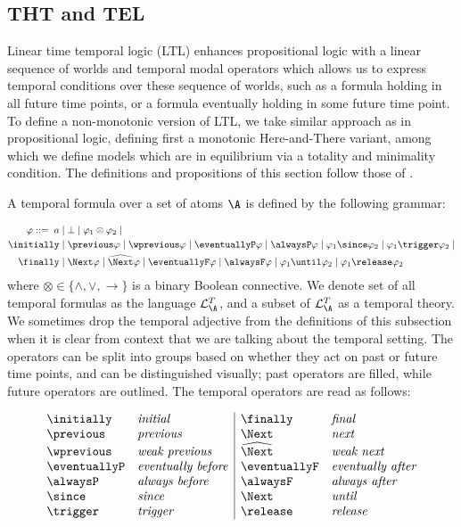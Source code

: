 \subsection{THT and TEL}

Linear time temporal logic (LTL) enhances propositional logic with a
linear sequence of worlds and temporal modal operators which allows us
to express temporal conditions over these sequence of worlds, such as
a formula holding in all future time points, or a formula eventually
holding in some future time point. To define a non-monotonic version
of LTL, we take similar approach as in propositional logic, defining
first a monotonic Here-and-There variant, among which we define models
which are in equilibrium via a totality and minimality condition. The
definitions and propositions of this section follow those of
\citeauthor{agcadipescscvi20a}\cite{agcadipescscvi20a}.

A temporal formula over a set of atoms $\A$ is defined by the
following grammar:

\begin{align*}
    \varphi ::=   \; a &\mid \bot \mid \varphi_1 \otimes \varphi_2 \mid\\
  \initially &\mid \previous \varphi \mid \wprevious \varphi \mid \eventuallyP \varphi \mid
  \alwaysP \varphi \mid \varphi_1 \since \varphi_2 \mid \varphi_1 \trigger \varphi_2 \mid\\
  \finally &\mid \Next \varphi \mid \wnext \varphi \mid \eventuallyF \varphi \mid
  \alwaysF \varphi \mid \varphi_1 \until \varphi_2 \mid \varphi_1 \release \varphi_2
\end{align*}
where $\otimes \in \{ \wedge, \vee, \to \}$ is a binary Boolean
connective. We denote set of all temporal formulas as the language
$\mathcal{L}_{\A}^{T}$, and a subset of $\mathcal{L}_{\A}^{T}$ as a
temporal theory. We sometimes drop the temporal adjective from the
definitions of this subsection when it is clear from context that we
are talking about the temporal setting. The operators can be split
into groups based on whether they act on past or future time points,
and can be distinguished visually; past operators are filled, while
future operators are outlined. The temporal operators are read as follows:

\[
  \begin{array}{l l|l l}
    \initially & \text{\emph{initial}} & \finally & \text{\emph{final}}\\
    \previous & \text{\emph{previous}} & \Next & \text{\emph{next}}\\
    \wprevious & \text{\emph{weak previous}} & \wnext & \text{\emph{weak next}}\\
    \eventuallyP & \text{\emph{eventually before}} & \eventuallyF & \text{\emph{eventually after}}\\
    \alwaysP & \text{\emph{always before}} & \alwaysF & \text{\emph{always after}}\\
    \since & \text{\emph{since}} & \Next & \text{\emph{until}}\\
    \trigger & \text{\emph{trigger}} & \release & \text{\emph{release}}
\end{array}
\]

